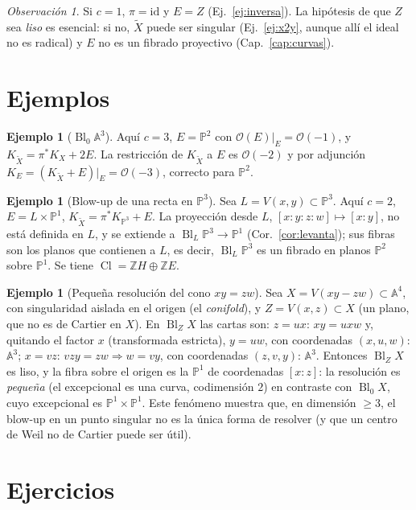 \documentclass[11pt,a4paper,oneside]{book}
\newcommand{\Bl}{\operatorname{Bl}}
\newcommand{\Cl}{\operatorname{Cl}}
\newcommand{\A}{\mathbb{A}}
\newcommand{\PP}{\mathbb{P}}
\newcommand{\ZZ}{\mathbb{Z}}
\newcommand{\cO}{\mathcal{O}}
\theoremstyle{plain}
\theoremstyle{definition}
\newtheorem{ejemplo}[teorema]{Ejemplo}
\theoremstyle{remark}
\newtheorem{observacion}[teorema]{Observación}
\begin{document}
\begin{observacion}
Si $c=1$, $\pi=\mathrm{id}$ y $E=Z$ (Ej.~\ref{ej:inversa}). La hipótesis de que $Z$ sea \emph{liso} es esencial: si no, $\tilde X$ puede ser singular (Ej.~\ref{ej:x2y}, aunque allí el ideal no es radical) y $E$ no es un fibrado proyectivo (Cap.~\ref{cap:curvas}).
\end{observacion}

\section{Ejemplos}

\begin{ejemplo}[$\Bl_0\A^3$]
Aquí $c=3$, $E=\PP^2$ con $\cO(E)|_E=\cO(-1)$, y $K_{\tilde X}=\pi^*K_X+2E$. La restricción de $K_{\tilde X}$ a $E$ es $\cO(-2)$ y por adjunción $K_E=(K_{\tilde X}+E)|_E=\cO(-3)$, correcto para $\PP^2$.
\end{ejemplo}

\begin{ejemplo}[Blow-up de una recta en $\PP^3$]\label{ej:recta-p3}
Sea $L=V(x,y)\subset\PP^3$. Aquí $c=2$, $E=L\times\PP^1$, $K_{\tilde X}=\pi^*K_{\PP^3}+E$. La proyección desde $L$, $[x:y:z:w]\mapsto[x:y]$, no está definida en $L$, y se extiende a $\Bl_L\PP^3\to\PP^1$ (Cor.~\ref{cor:levanta}); sus fibras son los planos que contienen a $L$, es decir, $\Bl_L\PP^3$ es un fibrado en planos $\PP^2$ sobre $\PP^1$. Se tiene $\Cl=\ZZ H\oplus\ZZ E$.
\end{ejemplo}

\begin{ejemplo}[Pequeña resolución del cono $xy=zw$]\label{ej:conifold}
Sea $X=V(xy-zw)\subset\A^4$, con singularidad aislada en el origen (el \emph{conifold}), y $Z=V(x,z)\subset X$ (un plano, que no es de Cartier en $X$). En $\Bl_ZX$ las cartas son: $z=ux$: $xy=uxw$ y, quitando el factor $x$ (transformada estricta), $y=uw$, con coordenadas $(x,u,w)$: $\A^3$; $x=vz$: $vzy=zw\Rightarrow w=vy$, con coordenadas $(z,v,y)$: $\A^3$. Entonces $\Bl_ZX$ es liso, y la fibra sobre el origen es la $\PP^1$ de coordenadas $[x:z]$: la resolución es \emph{pequeña} (el excepcional es una curva, codimensión $2$) en contraste con $\Bl_0X$, cuyo excepcional es $\PP^1\times\PP^1$. Este fenómeno muestra que, en dimensión $\ge3$, el blow-up en un punto singular no es la única forma de resolver (y que un centro de Weil no de Cartier puede ser útil).
\end{ejemplo}

\section*{Ejercicios}
\end{document}
